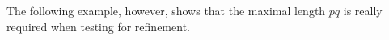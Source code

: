 The following example, however, shows that the maximal length $pq$ is really
required when testing for refinement.
%
%
%

